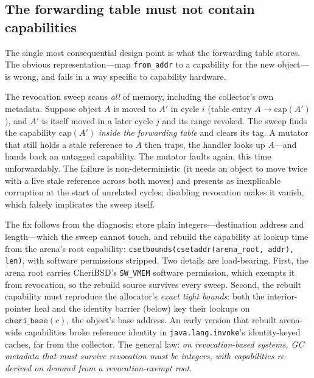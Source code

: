 \documentclass[acmsmall,nonacm,screen]{acmart}
\begin{document}
\subsection{The forwarding table must not contain capabilities}
\label{sec:design:fwd}

The single most consequential design point is what the forwarding table
stores. The obvious representation---map \texttt{from\_addr} to a
capability for the new object---is wrong, and fails in a way specific
to capability hardware.

The revocation sweep scans \emph{all} of memory, including the
collector's own metadata. Suppose object $A$ is moved to $A'$ in cycle
$i$ (table entry $A \to \mathrm{cap}(A')$), and $A'$ is itself moved in
a later cycle $j$ and its range revoked. The sweep finds the capability
$\mathrm{cap}(A')$ \emph{inside the forwarding table} and clears its
tag. A mutator that still holds a stale reference to $A$ then traps,
the handler looks up $A$---and hands back an untagged capability. The
mutator faults again, this time unforwardably. The failure is
non-deterministic (it needs an object to move twice with a live stale
reference across both moves) and presents as inexplicable corruption at
the start of unrelated cycles; disabling revocation makes it vanish,
which falsely implicates the sweep itself.

The fix follows from the diagnosis: store plain integers---destination
address and length---which the sweep cannot touch, and rebuild the
capability at lookup time from the arena's root capability:
\texttt{csetbounds(csetaddr(arena\_root, addr), len)}, with software
permissions stripped. Two details are load-bearing. First, the arena
root carries CheriBSD's \texttt{SW\_VMEM} software permission, which
exempts it from revocation, so the rebuild source survives every sweep.
Second, the rebuilt capability must reproduce the allocator's
\emph{exact tight bounds}: both the interior-pointer heal and the
identity barrier (below) key their lookups on
$\texttt{cheri\_base}(c)$, the object's base address. An early version
that rebuilt arena-wide capabilities broke reference identity in
\texttt{java.lang.invoke}'s identity-keyed caches, far from the
collector. The general law: \emph{on revocation-based systems, GC
metadata that must survive revocation must be integers, with
capabilities re-derived on demand from a revocation-exempt root.}
\end{document}
